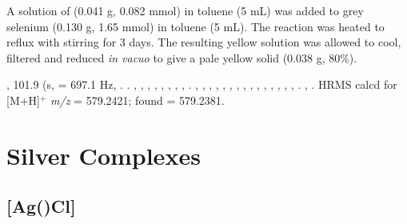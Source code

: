 A solution of \tBuxantphos{} (0.041 g, 0.082 mmol) in toluene (5 mL) was added to grey selenium (0.130 g, 1.65 mmol) in toluene (5 mL).  The reaction was heated to reflux with stirring for 3 days.  The resulting yellow solution was allowed to cool, filtered and reduced \emph{in vacuo} to give a pale yellow solid (0.038 g, 80\%).    

,
101.9 (s, \JPSe{} = 697.1 Hz, .
.
,
,
,
,
,
,
,
,
.
,
,
,
,
,
,
,
,
,
,
,
,
,
,
,
.
,
.
HRMS calcd for  [M+H]$^+$ \emph{m/z} = 579.2421; found = 579.2381.

\section{Silver Complexes}
\label{section:experimental:silver}



\subsection*{[Ag(\tButhixantphos)Cl]}


